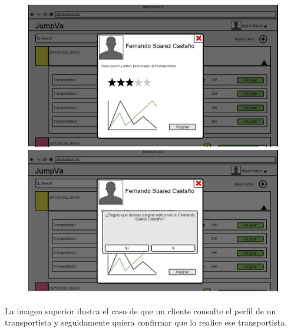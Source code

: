 \documentclass[10pt, a4paper,spanish]{article}
\begin{document}
		\begin{figure}[H]
			\centering
			\begin{minipage}[b]{0.49\textwidth}
				\includegraphics[width=\textwidth]{res/DetallesTransportista.png}
			\end{minipage}
			\begin{minipage}[b]{0.49\textwidth}
				\includegraphics[width=\textwidth]{res/ConfirmacionAsignacion.png}
			\end{minipage}
		\end{figure}

		\paragraph{}
		La imagen superior ilustra el caso de que un cliente consulte el perfil de un transportista y seguidamente quiera confirmar que lo realice ese transportista.
\end{document}
